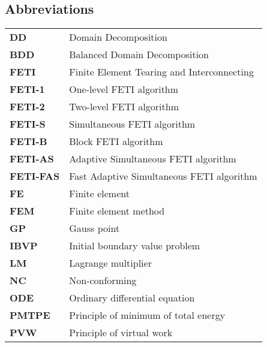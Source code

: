 \subsection*{Abbreviations}
\begin{tabular}{l l}
\textbf{DD}  &Domain Decomposition  \\
\textbf{BDD}  &Balanced Domain Decomposition  \\
\textbf{FETI}  &Finite Element Tearing and Interconnecting\\
\textbf{FETI-1} &One-level FETI algorithm\\
\textbf{FETI-2} &Two-level FETI algorithm\\
\textbf{FETI-S} &Simultaneous FETI algorithm\\
\textbf{FETI-B} &Block FETI algorithm\\
\textbf{FETI-AS} &Adaptive Simultaneous FETI algorithm\\
\textbf{FETI-FAS} &Fast Adaptive Simultaneous FETI algorithm\\
\textbf{FE}  &Finite element  \\
\textbf{FEM}  &Finite element method  \\
\textbf{GP}  &Gauss point  \\
\textbf{IBVP}  &Initial boundary value problem  \\
\textbf{LM}  &Lagrange multiplier  \\
\textbf{NC}  &Non-conforming  \\
\textbf{ODE}  &Ordinary differential equation \\
\textbf{PMTPE}  &Principle of minimum of total energy  \\
\textbf{PVW}  &Principle of virtual work
\end{tabular}


